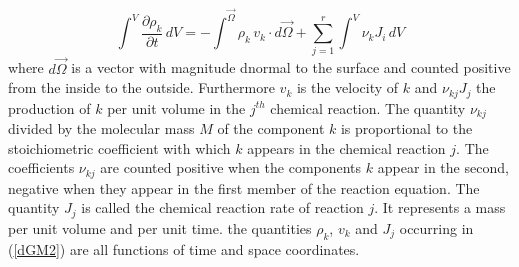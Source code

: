 \begin{equation}
\int^V \frac{\partial \rho_k}{\partial t}\, dV = - \int^\vec{\Omega} \rho_k\, v_k \cdot d\vec{\Omega} + \sum_{j=1}^r \int^V \nu_k J_i\, dV
\label{dGM2}
\end{equation}
where $d\vec{\Omega}$ is a vector with magnitude d\Omega normal to the surface and counted positive from the inside to the outside. Furthermore $v_k$ is the velocity of $k$ and $\nu_{kj} J_j$  the production of $k$ per unit volume in the $j^{th}$ chemical reaction.  The quantity $\nu_{kj}$ divided by the molecular mass $M$ of the component $k$ is proportional to the stoichiometric coefficient with which $k$ appears in the chemical reaction $j$. The coefficients $\nu_{kj}$ are counted positive when the components $k$ appear in the second, negative when they appear in the first member of the reaction equation. The quantity $J_j$ is called the chemical reaction rate of reaction $j$. It represents a mass per unit volume and per unit time. the quantities $\rho_k$, $v_k$ and $J_j$ occurring in (\ref{dGM2}) are all functions of time and space coordinates.